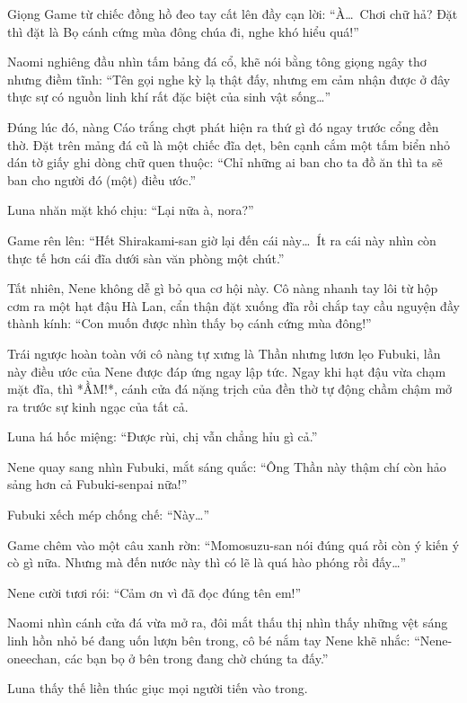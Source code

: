 \documentclass[../main.tex]{subfiles}
\begin{document}
Giọng Game từ chiếc đồng hồ đeo tay cất lên đầy cạn lời: ``À\dots\ Chơi chữ hả? Đặt thì đặt là Bọ cánh cứng mùa đông chúa đi, nghe khó hiểu quá!''

Naomi nghiêng đầu nhìn tấm bảng đá cổ, khẽ nói bằng tông giọng ngây thơ nhưng điềm tĩnh: ``Tên gọi nghe kỳ lạ thật đấy, nhưng em cảm nhận được ở đây thực sự có nguồn linh khí rất đặc biệt của sinh vật sống\dots''

Đúng lúc đó, nàng Cáo trắng chợt phát hiện ra thứ gì đó ngay trước cổng đền thờ. Đặt trên mảng đá cũ là một chiếc đĩa dẹt, bên cạnh cắm một tấm biển nhỏ dán tờ giấy ghi dòng chữ quen thuộc: ``Chỉ những ai ban cho ta đồ ăn thì ta sẽ ban cho người đó (một) điều ước.''

Luna nhăn mặt khó chịu: ``Lại nữa à, nora?''

Game rên lên: ``Hết Shirakami-san giờ lại đến cái này\dots\ Ít ra cái này nhìn còn thực tế hơn cái đĩa dưới sàn văn phòng một chút.''

Tất nhiên, Nene không dễ gì bỏ qua cơ hội này. Cô nàng nhanh tay lôi từ hộp cơm ra một hạt đậu Hà Lan, cẩn thận đặt xuống đĩa rồi chắp tay cầu nguyện đầy thành kính: ``Con muốn được nhìn thấy bọ cánh cứng mùa đông!''


Trái ngược hoàn toàn với cô nàng tự xưng là Thần nhưng lươn lẹo Fubuki, lần này điều ước của Nene được đáp ứng ngay lập tức. Ngay khi hạt đậu vừa chạm mặt đĩa, thì *ẦM!*, cánh cửa đá nặng trịch của đền thờ tự động chầm chậm mở ra trước sự kinh ngạc của tất cả.

Luna há hốc miệng: ``Được rùi, chị vẫn chẳng hỉu gì cả.''

Nene quay sang nhìn Fubuki, mắt sáng quắc: ``Ông Thần này thậm chí còn hảo sảng hơn cả Fubuki-senpai nữa!''

Fubuki xếch mép chống chế: ``Này\dots''

Game chêm vào một câu xanh rờn: ``Momosuzu-san nói đúng quá rồi còn ý kiến ý cò gì nữa. Nhưng mà đến nước này thì có lẽ là quá hào phóng rồi đấy\dots''

Nene cười tươi rói: ``Cảm ơn vì đã đọc đúng tên em!''

Naomi nhìn cánh cửa đá vừa mở ra, đôi mắt thấu thị nhìn thấy những vệt sáng linh hồn nhỏ bé đang uốn lượn bên trong, cô bé nắm tay Nene khẽ nhắc: ``Nene-oneechan, các bạn bọ ở bên trong đang chờ chúng ta đấy.''

Luna thấy thế liền thúc giục mọi người tiến vào trong.

\ct
\end{document}
